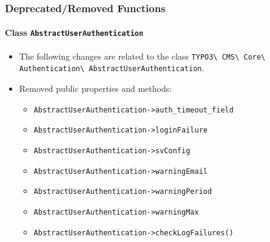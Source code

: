 %

\begin{frame}[fragile]
	\frametitle{Deprecated/Removed Functions}
	\framesubtitle{Class \texttt{AbstractUserAuthentication}}

	\begin{itemize}
		\item The following changes are related to the class\newline
			\texttt{TYPO3\textbackslash
				CMS\textbackslash
				Core\textbackslash
				Authentication\textbackslash
				AbstractUserAuthentication}.

		\item Removed public properties and methods:

			\begin{itemize}\small
				\item \texttt{AbstractUserAuthentication->auth\_timeout\_field}
				\item \texttt{AbstractUserAuthentication->loginFailure}
				\item \texttt{AbstractUserAuthentication->svConfig}
				\item \texttt{AbstractUserAuthentication->warningEmail}
				\item \texttt{AbstractUserAuthentication->warningPeriod}
				\item \texttt{AbstractUserAuthentication->warningMax}
				\item \texttt{AbstractUserAuthentication->checkLogFailures()}
			\end{itemize}\normalsize

	\end{itemize}

\end{frame}

